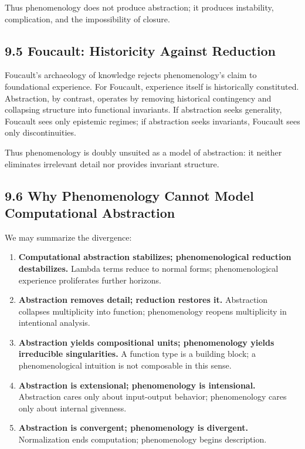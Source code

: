 \documentclass[12pt,letterpaper]{article}
\begin{document}
Thus phenomenology does not produce abstraction; it produces instability, complication, and the impossibility of closure.

\subsection{9.5 Foucault: Historicity Against Reduction}
Foucault’s archaeology of knowledge \parencite{Foucault1970} rejects phenomenology’s claim to foundational experience. For Foucault, experience itself is historically constituted. Abstraction, by contrast, operates by removing historical contingency and collapsing structure into functional invariants. If abstraction seeks generality, Foucault sees only epistemic regimes; if abstraction seeks invariants, Foucault sees only discontinuities.

Thus phenomenology is doubly unsuited as a model of abstraction: it neither eliminates irrelevant detail nor provides invariant structure.

\subsection{9.6 Why Phenomenology Cannot Model Computational Abstraction}

We may summarize the divergence:

\begin{enumerate}[itemsep=0.5em]
    \item \textbf{Computational abstraction stabilizes; phenomenological reduction destabilizes.}  
    Lambda terms reduce to normal forms; phenomenological experience proliferates further horizons.

    \item \textbf{Abstraction removes detail; reduction restores it.}  
    Abstraction collapses multiplicity into function; phenomenology reopens multiplicity in intentional analysis.

    \item \textbf{Abstraction yields compositional units; phenomenology yields irreducible singularities.}  
    A function type is a building block; a phenomenological intuition is not composable in this sense.

    \item \textbf{Abstraction is extensional; phenomenology is intensional.}  
    Abstraction cares only about input-output behavior; phenomenology cares only about internal givenness.

    \item \textbf{Abstraction is convergent; phenomenology is divergent.}  
    Normalization ends computation; phenomenology begins description.
\end{enumerate}
\end{document}
